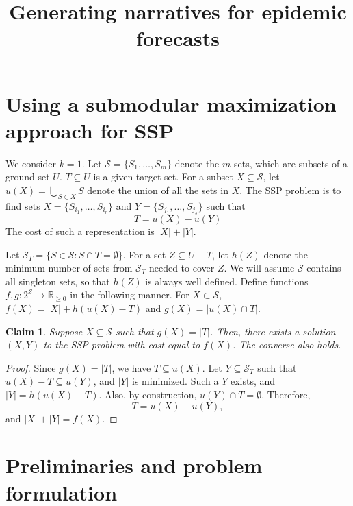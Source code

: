 \documentclass[twoside, leqno, twocolumn]{article}
\title{Generating narratives for epidemic forecasts}
\newtheorem{claim}[lemma]{Claim} %
\begin{document}
%










\section{Using a submodular maximization approach for SSP}
We consider $k=1$.
Let $\mathcal{S} = \{S_1,\ldots,S_m\}$ denote the $m$ sets, which are subsets of
a ground set $U$. $T\subseteq U$ is a given target set.  For a subset
$X\subseteq \mathcal{S}$, let $u(X)=\bigcup_{S\in X} S$ denote the union of all the
sets in $X$.  The SSP problem is to
find sets $X=\{S_{i_1},\ldots,S_{i_r}\}$ and $Y=\{S_{j_1},\ldots,S_{j_s}\}$ such that
\[
T= u(X) - u(Y)
\]
The cost of such a representation is $|X|+|Y|$.

Let $\mathcal{S}_T=\{S\in\mathcal{S}: S\cap T=\emptyset\}$.
For a set $Z\subseteq U-T$, let $h(Z)$ denote the minimum number of sets from $\mathcal{S}_T$
needed to cover $Z$. We will assume $\mathcal{S}$ contains all singleton sets, so that
$h(Z)$ is always well defined.
Define functions $f,g:2^{\mathcal{S}}\rightarrow \mathbb{R}_{\geq 0}$ in the following manner.
For $X\subset \mathcal{S}$, $f(X)=|X| + h(u(X)-T)$ and $g(X)=|u(X)\cap T|$.

\begin{claim}
Suppose $X\subseteq\mathcal{S}$ such that $g(X)=|T|$. Then, there exists a solution $(X, Y)$
to the SSP problem with cost equal to $f(X)$. The converse also holds.
\end{claim}
\begin{proof}
Since $g(X)=|T|$, we have $T\subseteq u(X)$. Let $Y\subseteq \mathcal{S}_T$
such that $u(X)-T \subseteq u(Y)$, and $|Y|$ is minimized.
Such a $Y$ exists, and $|Y|=h(u(X)-T)$. Also, by construction, $u(Y)\cap T=\emptyset$.
Therefore,
\[
T = u(X) - u(Y),
\]
and $|X|+|Y| = f(X)$.
\end{proof}

\section{Preliminaries and problem formulation}
\end{document}
